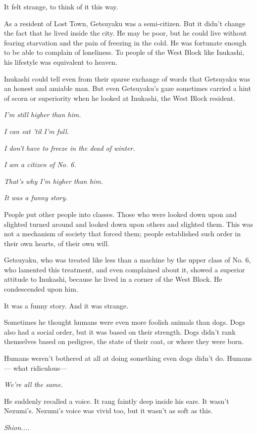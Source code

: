 It felt strange, to think of it this way.

As a resident of Lost Town, Getsuyaku was a semi-citizen. But it didn't
change the fact that he lived inside the city. He may be poor, but he
could live without fearing starvation and the pain of freezing in the
cold. He was fortunate enough to be able to complain of loneliness. To
people of the West Block like Inukashi, his lifestyle was equivalent to
heaven.

Inukashi could tell even from their sparse exchange of words that
Getsuyaku was an honest and amiable man. But even Getsuyaku's gaze
sometimes carried a hint of scorn or superiority when he looked at
Inukashi, the West Block resident.

\emph{I'm still higher than him.}

\emph{I can eat 'til I'm full.}

\emph{I don't have to freeze in the dead of winter.}

\emph{I am a citizen of No. 6.}

\emph{That's why I'm higher than him.}

\emph{It was a funny story.}

People put other people into classes. Those who were looked down upon
and slighted turned around and looked down upon others and slighted
them. This was not a mechanism of society that forced them; people
established such order in their own hearts, of their own will.

Getsuyaku, who was treated like less than a machine by the upper class
of No. 6, who lamented this treatment, and even complained about it,
showed a superior attitude to Inukashi, because he lived in a corner of
the West Block. He condescended upon him.

It was a funny story. And it was strange.

Sometimes he thought humans were even more foolish animals than dogs.
Dogs also had a social order, but it was based on their strength. Dogs
didn't rank themselves based on pedigree, the state of their coat, or
where they were born.

Humans weren't bothered at all at doing something even dogs didn't do.
Humans--- what ridiculous---

\emph{We're all the same.}

He suddenly recalled a voice. It rang faintly deep inside his ears. It
wasn't Nezumi's. Nezumi's voice was vivid too, but it wasn't as soft as
this.

\emph{Shion....}

